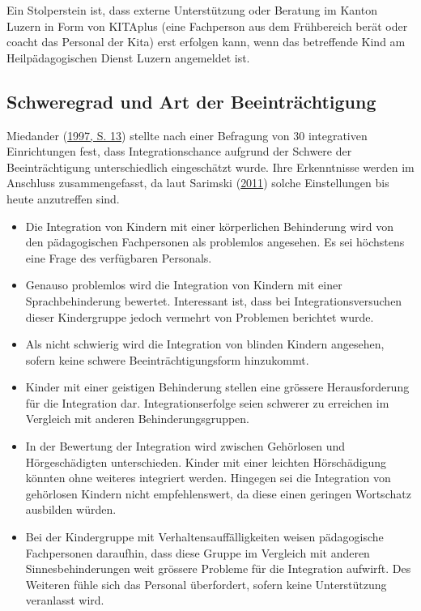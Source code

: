\documentclass[
  ngerman,
  11pt,
  paper=a4,
  twoside,
  titlepage=true,
  openright,
  abstract=on,
  toc=listofnumbered,
  numbers=noenddot,
  chapterprefix=true,
  headings=optiontohead,
  svgnames,
  dvipsnames]{scrreprt}
\providecommand{\tightlist}{%
  \setlength{\itemsep}{0pt}\setlength{\parskip}{0pt}}
\begin{document}
Ein Stolperstein ist, dass externe Unterstützung oder Beratung im Kanton
Luzern in Form von KITAplus (eine Fachperson aus dem Frühbereich berät
oder coacht das Personal der Kita) erst erfolgen kann, wenn das
betreffende Kind am Heilpädagogischen Dienst Luzern angemeldet ist.

\hypertarget{sec:schweregradBeeintruxe4chtigung}{%
\subsection{Schweregrad und Art der
Beeinträchtigung}\label{sec:schweregradBeeintruxe4chtigung}}

Miedander (\protect\hyperlink{ref-miedander}{1997, S. 13}) stellte nach
einer Befragung von 30 integrativen Einrichtungen fest, dass
Integrationschance aufgrund der Schwere der Beeinträchtigung
unterschiedlich eingeschätzt wurde. Ihre Erkenntnisse werden im
Anschluss zusammengefasst, da laut Sarimski
(\protect\hyperlink{ref-sarimskiBehinderteKinder2011}{2011}) solche
Einstellungen bis heute anzutreffen sind.

\begin{itemize}
\tightlist
\item
  Die Integration von Kindern mit einer körperlichen Behinderung wird
  von den pädagogischen Fachpersonen als problemlos angesehen. Es sei
  höchstens eine Frage des verfügbaren Personals.
\item
  Genauso problemlos wird die Integration von Kindern mit einer
  Sprachbehinderung bewertet. Interessant ist, dass bei
  Integrationsversuchen dieser Kindergruppe jedoch vermehrt von
  Problemen berichtet wurde.
\item
  Als nicht schwierig wird die Integration von blinden Kindern
  angesehen, sofern keine schwere Beeinträchtigungsform hinzukommt.
\item
  Kinder mit einer geistigen Behinderung stellen eine grössere
  Herausforderung für die Integration dar. Integrationserfolge seien
  schwerer zu erreichen im Vergleich mit anderen Behinderungsgruppen.
\item
  In der Bewertung der Integration wird zwischen Gehörlosen und
  Hörgeschädigten unterschieden. Kinder mit einer leichten Hörschädigung
  könnten ohne weiteres integriert werden. Hingegen sei die Integration
  von gehörlosen Kindern nicht empfehlenswert, da diese einen geringen
  Wortschatz ausbilden würden.
\item
  Bei der Kindergruppe mit Verhaltensauffälligkeiten weisen pädagogische
  Fachpersonen daraufhin, dass diese Gruppe im Vergleich mit anderen
  Sinnesbehinderungen weit grössere Probleme für die Integration
  aufwirft. Des Weiteren fühle sich das Personal überfordert, sofern
  keine Unterstützung veranlasst wird.
\end{itemize}
\end{document}
